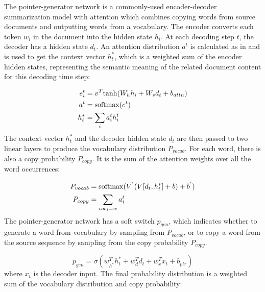 \documentclass[11pt,a4paper]{article}
\begin{document}
The pointer-generator network \cite{see2017ptr_gen} is a commonly-used encoder-decoder summarization model with attention \cite{bahdanau2014neural} which combines copying words from source documents and outputting words from a vocabulary.  The encoder converts each token $w_i$ in the document into the hidden state $h_i$. At each decoding step $t$, the decoder has a hidden state $d_t$. An attention distribution $a^t$ is calculated as in \cite{bahdanau2014neural} and is used to get the context vector $h_t^*$, which is a weighted sum of the encoder hidden states, representing the semantic meaning of the related document content for this decoding time step: 

\vspace{-4mm}
\begin{align}
\begin{split}
e_i^t &= v^T {\rm tanh} (W_h h_i + W_s d_t + b_{attn})  \\
a^t &= {\rm softmax}( e^t) \label{eq:pt} \\ 
h_{t}^{*} &= \sum_{i}a_{i}^{t}h_{i}^{t} 
\end{split}
\end{align}
The context vector $h_t^*$ and the decoder hidden state $d_t$ are then passed to two linear layers to produce the vocabulary distribution $P_{vocab}$. For each word, there is also a copy probability $P_{copy}$. It is the sum of the attention weights over all the word occurrences:

\vspace{-4mm}
\begin{align}
\begin{split}
    P_{vocab} &= {\rm softmax} (V^{'}(V[d_t, h_t^*] + b) + b^{'}) \\
    P_{copy} &= \sum_{i:w_i=w}a_i^t 
\end{split}
\end{align}
The pointer-generator network has a soft switch $p_{gen}$, which indicates whether to generate a word from vocabulary by sampling from $P_{vocab}$, or to copy a word from the source sequence by sampling from the copy probability $P_{copy}$. 

\vspace{-4mm}
\begin{equation}
      p_{gen} = \sigma (w_{h^*}^Th_t^* + w_d^Td_t + w_x^Tx_t + b_{ptr})
\end{equation}
where $x_t$ is the decoder input. The final probability distribution is a weighted sum of the vocabulary distribution and copy probability:
\end{document}
